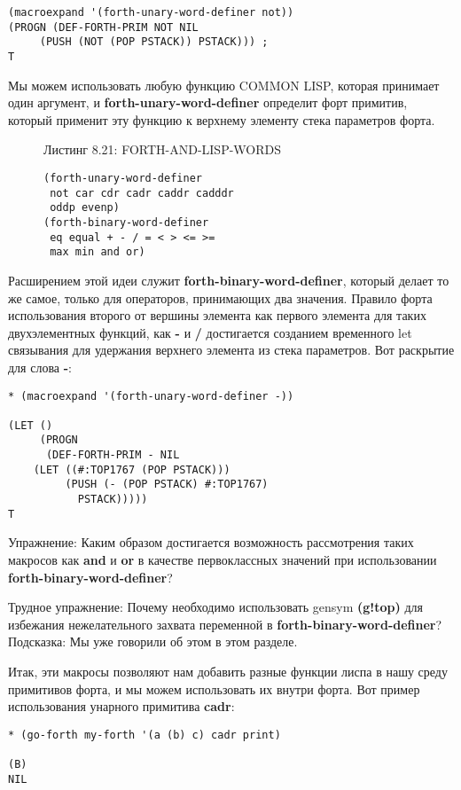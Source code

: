 \begin{verbatim}
(macroexpand '(forth-unary-word-definer not))
(PROGN (DEF-FORTH-PRIM NOT NIL
	 (PUSH (NOT (POP PSTACK)) PSTACK))) ;
T
\end{verbatim}

Мы можем использовать любую функцию COMMON LISP, которая принимает один аргумент, и \textbf{forth-unary-word-definer} определит форт примитив, который применит эту функцию к верхнему элементу стека параметров форта.

\begin{figure}Листинг 8.21: FORTH-AND-LISP-WORDS\label{listing_8.21}
\listbegin
\begin{verbatim}
(forth-unary-word-definer
 not car cdr cadr caddr cadddr
 oddp evenp)
(forth-binary-word-definer
 eq equal + - / = < > <= >=
 max min and or)
\end{verbatim}
\listend
\end{figure}

Расширением этой идеи служит \textbf{forth-binary-word-definer}, который делает то же самое, только для операторов, принимающих два значения. Правило форта использования второго от вершины элемента как первого элемента для таких двухэлементных функций, как \textbf{-} и \textbf{/} достигается созданием временного let связывания для удержания верхнего элемента из стека параметров. Вот раскрытие для слова \textbf{-}:

\begin{verbatim}
* (macroexpand '(forth-unary-word-definer -))

(LET ()
     (PROGN
      (DEF-FORTH-PRIM - NIL
	(LET ((#:TOP1767 (POP PSTACK)))
	     (PUSH (- (POP PSTACK) #:TOP1767)
		   PSTACK)))))
T
\end{verbatim}

Упражнение: Каким образом достигается возможность рассмотрения таких макросов как \textbf{and} и \textbf{or} в качестве первоклассных значений при использовании \textbf{forth-binary-word-definer}?

Трудное упражнение: Почему необходимо использовать gensym \textbf{(g!top)} для избежания нежелательного захвата переменной в \textbf{forth-binary-word-definer}? Подсказка: Мы уже говорили об этом в этом разделе.

Итак, эти макросы позволяют нам добавить разные функции лиспа в нашу среду примитивов форта, и мы можем использовать их внутри форта. Вот пример использования унарного примитива \textbf{cadr}:

\begin{verbatim}
* (go-forth my-forth '(a (b) c) cadr print)

(B) 
NIL
\end{verbatim}

